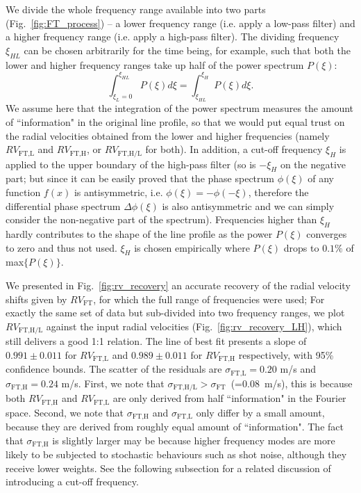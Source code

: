 We divide the whole frequency range available into two parts (Fig.~\ref{fig:FT_process}) -- a lower frequency range (i.e. apply a low-pass filter) and a higher frequency range (i.e. apply a high-pass filter). The dividing frequency $\xi_{HL}$ can be chosen arbitrarily for the time being, for example, such that both the lower and higher frequency ranges take up half of the power spectrum $P(\xi)$:
\begin{equation}
	\int_{\xi_{L}=0}^{\xi_{HL}} P(\xi) d\xi = \int_{\xi_{HL}}^{\xi_{H}} P(\xi) d\xi. 
\end{equation}
We assume here that the integration of the power spectrum measures the amount of ``information" in the original line profile, so that we would put equal trust on the radial velocities obtained from the lower and higher frequencies (namely $RV_\text{FT,L}$ and $RV_\text{FT,H}$, or $RV_\text{FT,H/L}$ for both). In addition, a cut-off frequency $\xi_{H}$ is applied to the upper boundary of the high-pass filter (so is $-\xi_{H}$ on the negative part; but since it can be easily proved that the phase spectrum $\phi(\xi)$ of any function $f(x)$ is antisymmetric, i.e. $\phi(\xi) = -\phi(-\xi)$, therefore the differential phase spectrum $\Delta \phi(\xi)$ is also antisymmetric and we can simply consider the non-negative part of the spectrum). Frequencies higher than $\xi_{H}$ hardly contributes to the shape of the line profile as the power $P(\xi)$ converges to zero and thus not used. $\xi_{H}$ is chosen empirically where $P(\xi)$ drops to $0.1\%$ of max$\{P(\xi)\}$.

We presented in Fig.~\ref{fig:rv_recovery} an accurate recovery of the radial velocity shifts given by $RV_\text{FT}$, for which the full range of frequencies were used; For exactly the same set of data but sub-divided into two frequency ranges, we plot $RV_\text{FT,H/L}$ against the input radial velocities (Fig.~\ref{fig:rv_recovery_LH}), which still delivers a good 1:1 relation. The line of best fit presents a slope of $0.991\pm0.011$ for $RV_\text{FT,L}$ and $0.989\pm0.011$ for $RV_\text{FT,H}$ respectively, with 95\% confidence bounds. The scatter of the residuals are $\sigma_\text{FT,L} = 0.20$ m/s and $\sigma_\text{FT,H} = 0.24$ m/s. First, we note that $\sigma_\text{FT,H/L} > \sigma_\text{FT}$~(=0.08~m/s), this is because both $RV_\text{FT,H}$ and $RV_\text{FT,L}$ are only derived from half ``information" in the Fourier space. Second, we note that $\sigma_\text{FT,H}$ and $\sigma_\text{FT,L}$ only differ by a small amount, because they are derived from roughly equal amount of ``information". The fact that $\sigma_\text{FT,H}$ is slightly larger may be because higher frequency modes are more likely to be subjected to stochastic behaviours such as shot noise, although they receive lower weights. See the following subsection for a related discussion of introducing a cut-off frequency.

